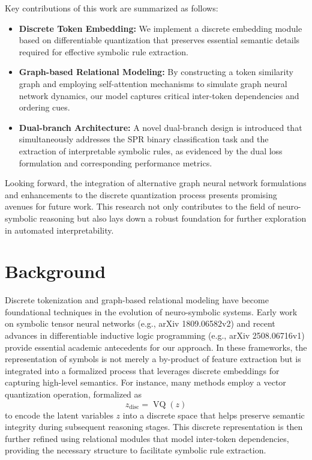 \documentclass{article}
\begin{document}
Key contributions of this work are summarized as follows:
\begin{itemize}
    \item \textbf{Discrete Token Embedding:} We implement a discrete embedding module based on differentiable quantization that preserves essential semantic details required for effective symbolic rule extraction.
    \item \textbf{Graph-based Relational Modeling:} By constructing a token similarity graph and employing self-attention mechanisms to simulate graph neural network dynamics, our model captures critical inter-token dependencies and ordering cues.
    \item \textbf{Dual-branch Architecture:} A novel dual-branch design is introduced that simultaneously addresses the SPR binary classification task and the extraction of interpretable symbolic rules, as evidenced by the dual loss formulation and corresponding performance metrics.
\end{itemize}
Looking forward, the integration of alternative graph neural network formulations and enhancements to the discrete quantization process presents promising avenues for future work. This research not only contributes to the field of neuro-symbolic reasoning but also lays down a robust foundation for further exploration in automated interpretability.

\section{Background}
Discrete tokenization and graph-based relational modeling have become foundational techniques in the evolution of neuro-symbolic systems. Early work on symbolic tensor neural networks (e.g., arXiv 1809.06582v2) and recent advances in differentiable inductive logic programming (e.g., arXiv 2508.06716v1) provide essential academic antecedents for our approach. In these frameworks, the representation of symbols is not merely a by-product of feature extraction but is integrated into a formalized process that leverages discrete embeddings for capturing high-level semantics. For instance, many methods employ a vector quantization operation, formalized as 
\[
z_{\text{disc}} = \operatorname{VQ}(z)
\]
to encode the latent variables \( z \) into a discrete space that helps preserve semantic integrity during subsequent reasoning stages. This discrete representation is then further refined using relational modules that model inter-token dependencies, providing the necessary structure to facilitate symbolic rule extraction.
\end{document}

